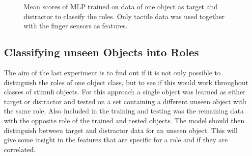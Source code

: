 
\begin{figure}[H]
	\caption{Mean scores of MLP trained on data of one object as target and distractor to classify the roles. Only tactile data was used together with the finger sensors as features.}
	\label{tnt}
\end{figure}

\subsection{Classifying unseen Objects into Roles}
The aim of the last experiment is to find out if it is not only possible to distinguish the roles of one object class, but to see if this would work throughout classes of stimuli objects. For this approach a single object was learned as either target or distractor and tested on a set containing a different unseen object with the same role. Also included in the training and testing was the remaining data with the opposite role of the trained and tested objects. The model should then distinguish between target and distractor data for an unseen object. This will give some insight in the features that are specific for a role and if they are correlated. 

